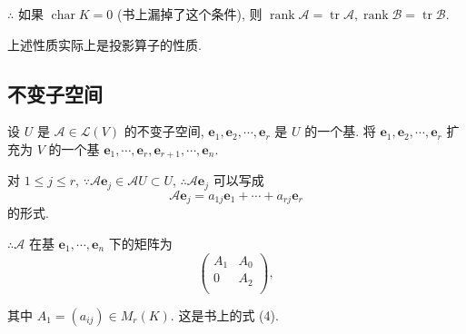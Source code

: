 \documentclass{ctexart}
\begin{document}
$\therefore$ 如果 $\operatorname{char}K=0$ (书上漏掉了这个条件), 则 $\operatorname{rank}\mathcal{A}=\operatorname{tr}\mathcal{A},\operatorname{rank}\mathcal{B}=\operatorname{tr}\mathcal{B}$.

上述性质实际上是投影算子的性质.
\subsection{不变子空间}
设 $U$ 是 $\mathcal{A}\in\mathcal{L}(V)$ 的不变子空间, $\boldsymbol{e}_1,\boldsymbol{e}_2,\cdots,\boldsymbol{e}_r$ 是 $U$ 的一个基. 将 $\boldsymbol{e}_1,\boldsymbol{e}_2,\cdots,\boldsymbol{e}_r$ 扩充为 $V$ 的一个基 $\boldsymbol{e}_1,\cdots,\boldsymbol{e}_r,\boldsymbol{e}_{r+1},\cdots,\boldsymbol{e}_n$.

对 $1\leq j\leq r$, $\because\mathcal{A}\boldsymbol{e}_j\in\mathcal{A}U\subset U$, $\therefore\mathcal{A}\boldsymbol{e}_j$ 可以写成
\[\mathcal{A}\boldsymbol{e}_j=a_{1j}\boldsymbol{e}_1+\cdots+a_{rj}\boldsymbol{e}_r\]
的形式.

$\therefore\mathcal{A}$ 在基 $\boldsymbol{e}_1,\cdots,\boldsymbol{e}_n$ 下的矩阵为
\begin{equation}\label{eq3.1}
    \begin{pmatrix}
        A_1 & A_0 \\
        0 & A_2 \\
    \end{pmatrix},
\end{equation}

其中 $A_1=(a_{ij})\in M_r(K)$. 这是书上的式 (4).
\end{document}
